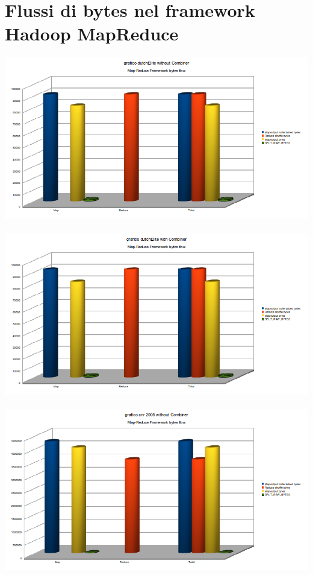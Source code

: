 \documentclass[a4paper,11pt]{report}
\begin{document}
\section{Flussi di bytes nel framework Hadoop MapReduce}
\paragraph{}
\centerline{\includegraphics[width=180mm]{images/grafici/deMRB.png}}
\paragraph{}
\centerline{\includegraphics[width=180mm]{images/grafici/deCombMRB.png}}
\paragraph{}
\centerline{\includegraphics[width=180mm]{images/grafici/cnrMRB.png}}
\end{document}
